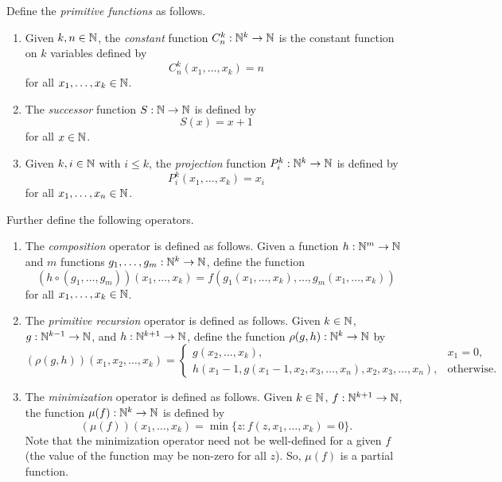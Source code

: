 	\begin{fdef}
		Define the \emph{primitive functions} as follows.
		\begin{enumerate}
			\item 
			Given $k,n \in \mathbb{N}$, the \emph{constant} function $C^k_n : \mathbb{N}^k \to \mathbb{N}$ is the constant function on $k$ variables defined by
			\[ C_n^k(x_1,\ldots,x_k) = n \]
			for all $x_1,\ldots,x_k \in \mathbb{N}$.

			\item
			The \emph{successor} function $S: \mathbb{N} \to \mathbb{N}$ is defined by
			\[ S(x) = x+1 \]
			for all $x \in \mathbb{N}$.

			\item
			Given $k,i \in \mathbb{N}$ with $i \le k$, the \emph{projection} function $P_i^k : \mathbb{N}^k \to \mathbb{N}$ is defined by
			\[ P_i^k(x_1,\ldots,x_k) = x_i \]
			for all $x_1,\ldots,x_n \in \mathbb{N}$.
		\end{enumerate}

		Further define the following operators.
		\begin{enumerate}
			\item
			The \emph{composition} operator is defined as follows.
			Given a function $h: \mathbb{N}^m \to \mathbb{N}$ and $m$ functions $g_1,\ldots,g_m : \mathbb{N}^k \to \mathbb{N}$, define the function
			\[ (h\circ(g_1,\ldots,g_m))(x_1,\ldots,x_k) = f(g_1(x_1,\ldots,x_k),\ldots,g_m(x_1,\ldots,x_k)) \]
			for all $x_1,\ldots,x_k \in \mathbb{N}$.

			\item
			The \emph{primitive recursion} operator is defined as follows.
			Given $k \in \mathbb{N}$, $g : \mathbb{N}^{k-1} \to \mathbb{N}$, and $h: \mathbb{N}^{k+1} \to \mathbb{N}$, define the function $\rho(g,h) : \mathbb{N}^{k} \to \mathbb{N}$ by
			\[ (\rho(g,h))(x_1,x_2,\ldots,x_k) = \begin{cases} g(x_2,\ldots,x_k), & x_1 = 0, \\ h(x_1-1,g(x_1-1,x_2,x_3,\ldots,x_n),x_2,x_3,\ldots,x_n), & \text{otherwise.} \end{cases} \]

			\item
			The \emph{minimization} operator is defined as follows. Given $k\in\mathbb{N}$, $f:\mathbb{N}^{k+1} \to \mathbb{N}$, the function $\mu(f) : \mathbb{N}^k \to \mathbb{N}$ is defined by
			\[ (\mu(f))(x_1,\ldots,x_k) = \min \{ z : f(z,x_1,\ldots,x_k) = 0 \}. \]
			Note that the minimization operator need not be well-defined for a given $f$ (the value of the function may be non-zero for all $z$). So, $\mu(f)$ is a partial function.
		\end{enumerate}
	\end{fdef}

